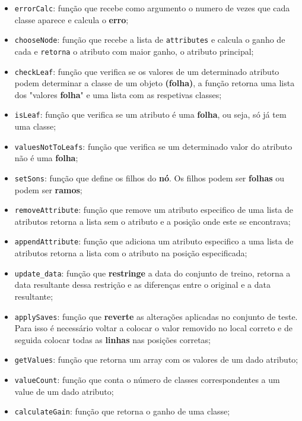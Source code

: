 \documentclass[11pt]{article}   %
\begin{document}
\begin{itemize}
\begin{itemize}
\begin{itemize}
            \item \verb|errorCalc|: função que recebe como argumento o numero de vezes que cada classe aparece e calcula o \textbf{erro};
            \item \verb|chooseNode|: função que recebe a lista de \verb|attributes| e calcula o ganho de cada e \verb|retorna| o atributo com maior ganho,
            o atributo principal;
            \item \verb|checkLeaf|: função que verifica se os valores de um determinado atributo podem determinar a classe de um objeto \textbf{(folha)},
            a função retorna uma lista dos "valores \textbf{folha}" e uma lista com as respetivas classes;
            \item \verb|isLeaf|: função que verifica se um atributo é uma \textbf{folha}, ou seja, só já tem uma classe;
            \item \verb|valuesNotToLeafs|: função que verifica se um determinado valor do atributo não é uma \textbf{folha};
            \item \verb|setSons|: função que define os filhos do \textbf{nó}. Os filhos podem ser \textbf{folhas} ou podem ser \textbf{ramos};
            \item \verb|removeAttribute|: função que remove um atributo especifico de uma lista de atributos retorna a lista sem o atributo e 
            a posição onde este se encontrava;
            \item \verb|appendAttribute|: função que adiciona um atributo especifico a uma lista de atributos retorna a lista com o atributo 
            na posição especificada;
            \item \verb|update_data|: função que \textbf{restringe} a data do conjunto de treino, retorna a data resultante dessa restrição 
            e as diferenças entre o original e a data resultante;
            \item \verb|applySaves|: função que \textbf{reverte} as alterações aplicadas no conjunto de teste. Para isso é necessário voltar 
            a colocar o valor removido no local correto e de seguida colocar todas as \textbf{linhas} nas posições corretas;
            \item \verb|getValues|: função que retorna um array com os valores de um dado atributo;
            \item \verb|valueCount|: função que conta o número de classes correspondentes a um value de um dado atributo;
            \item \verb|calculateGain|: função que retorna o ganho de uma classe;

\end{itemize}
\end{itemize}
\end{itemize}
\end{document}
